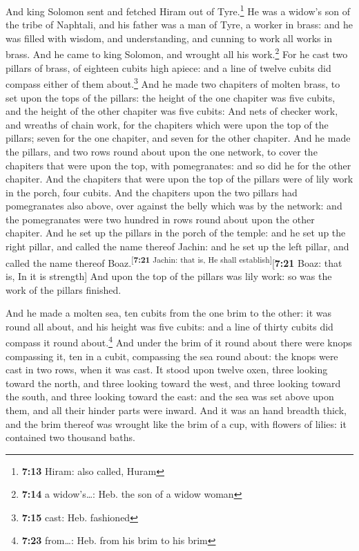  And king Solomon sent and fetched Hiram out of
Tyre.\footnote{\textbf{7:13} Hiram: also called, Huram} 
He was a widow's son of the tribe of Naphtali, and his father was a man
of Tyre, a worker in brass: and he was filled with wisdom, and
understanding, and cunning to work all works in brass. And he came to
king Solomon, and wrought all his work.\footnote{\textbf{7:14} a
  widow's\ldots: Heb. the son of a widow woman}  For he
cast two pillars of brass, of eighteen cubits high apiece: and a line of
twelve cubits did compass either of them about.\footnote{\textbf{7:15}
  cast: Heb. fashioned}  And he made two chapiters of
molten brass, to set upon the tops of the pillars: the height of the one
chapiter was five cubits, and the height of the other chapiter was five
cubits:  And nets of checker work, and wreaths of chain
work, for the chapiters which were upon the top of the pillars; seven
for the one chapiter, and seven for the other chapiter. 
And he made the pillars, and two rows round about upon the one network,
to cover the chapiters that were upon the top, with pomegranates: and so
did he for the other chapiter.  And the chapiters that
were upon the top of the pillars were of lily work in the porch, four
cubits.  And the chapiters upon the two pillars had
pomegranates also above, over against the belly which was by the
network: and the pomegranates were two hundred in rows round about upon
the other chapiter.  And he set up the pillars in the
porch of the temple: and he set up the right pillar, and called the name
thereof Jachin: and he set up the left pillar, and called the name
thereof Boaz.\textsuperscript{{[}\textbf{7:21} Jachin: that is, He shall
establish{]}}{[}\textbf{7:21} Boaz: that is, In it is strength{]}
 And upon the top of the pillars was lily work: so was
the work of the pillars finished.

 And he made a molten sea, ten cubits from the one brim
to the other: it was round all about, and his height was five cubits:
and a line of thirty cubits did compass it round about.\footnote{\textbf{7:23}
  from\ldots: Heb. from his brim to his brim}  And under
the brim of it round about there were knops compassing it, ten in a
cubit, compassing the sea round about: the knops were cast in two rows,
when it was cast.  It stood upon twelve oxen, three
looking toward the north, and three looking toward the west, and three
looking toward the south, and three looking toward the east: and the sea
was set above upon them, and all their hinder parts were inward.
 And it was an hand breadth thick, and the brim thereof
was wrought like the brim of a cup, with flowers of lilies: it contained
two thousand baths.

